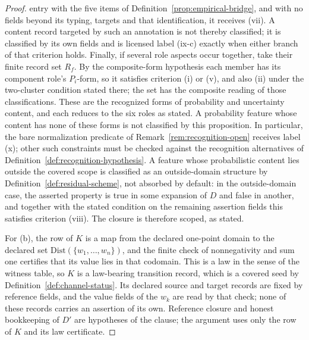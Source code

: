 \begin{proof}
entry with the five items of Definition~\ref{prop:empirical-bridge}, and with
no fields beyond its typing, targets and that identification, it
receives (vii). A content record targeted by such an annotation is not thereby classified; it is classified by its own fields and is licensed label (ix-c) exactly when either branch of that criterion holds. Finally, if several role aspects occur together, take their finite
record set \(R_f\). By the composite-form hypothesis each member has
its component role's \(P_i\)-form, so it satisfies criterion (i) or (v), and
also (ii) under the two-cluster condition stated there;
the set has the composite reading of those classifications. These are the recognized forms of probability and uncertainty content, and
each reduces to the six roles as stated. A probability feature whose content
has none of these forms is not classified by this proposition. In particular,
the bare normalization predicate of Remark~\ref{rem:recognition-open} receives
label (x); other such constraints must be checked against the recognition
alternatives of Definition~\ref{def:recognition-hypothesis}.
A feature whose probabilistic content lies outside the covered scope is classified as an outside-domain structure by Definition~\ref{def:residual-scheme}, not absorbed by default: in the outside-domain case, the asserted property is true in some expansion of \(D\) and false in another, and together with the stated condition on the remaining assertion fields this satisfies criterion (viii). The
closure is therefore scoped, as stated.

For (b), the row of \(K\) is a map from the declared one-point
domain to the declared set \(\mathrm{Dist}(\{w_1,\dots,w_n\})\), and the finite
check of nonnegativity and sum one certifies that its value lies in that
codomain. This is a law in the sense of the witness table, so \(K\) is a
law-bearing transition record, which is a covered \Pfour{} seed by
Definition~\ref{def:channel-status}. Its declared source and target records are fixed by reference fields, and the
value fields of the \(w_k\) are read by that check; none of these records carries
an assertion of its own.
Reference closure and honest bookkeeping of \(D'\) are hypotheses of the
clause; the argument uses only the row of \(K\) and its law certificate.
\end{proof}

